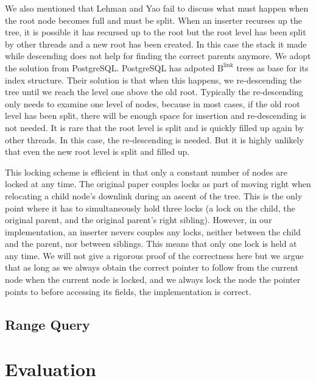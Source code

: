 \documentclass[twoside,11pt,openright]{report}
\theoremstyle{definition}
\begin{document}
We also mentioned that Lehman and Yao fail to discuss what must happen when the root node becomes full and must be split. When an inserter recurses up the tree, it is possible it has recursed up to the root but the root level has been split by other threads and a new root has been created. In this case the stack it made while descending does not help for finding the correct parents anymore. We adopt the solution from PostgreSQL. PostgreSQL has adpoted $\text{B}^{\text{link}}$ trees as base for its index structure. Their solution is that when this happens, we re-descending the tree until we reach the level one above the old root. Typically the re-descending only needs to examine one level of nodes, because in most cases, if the old root level has been split, there will be enough space for insertion and re-descending is not needed. It is rare that the root level is split and is quickly filled up again by other threads. In this case, the re-descending is needed. But it is highly unlikely that even the new root level is split and filled up.

This locking scheme is efficient in that only a constant number of nodes are locked at any time. The original paper couples locks as part of moving right when relocating a child node's downlink during an ascent of the tree.  This is the only point where it has to simultaneously hold three locks (a lock on the child, the original parent, and the original parent's right sibling). However, in our implementation, an inserter nevers couples any locks, neither between the child and the parent, nor between siblings. This means that only one lock is held at any time. We will not give a rigorous proof of the correctness here but we argue that as long as we always obtain the correct pointer to follow from the current node when the current node is locked, and we always lock the node the pointer points to before accessing its fields, the implementation is correct.

\section{Range Query}
\label{sec:range-query}


\chapter{Evaluation}
\label{ch:evaluation}
\end{document}
